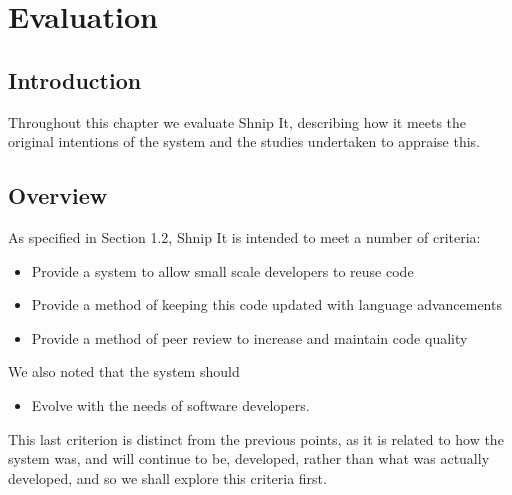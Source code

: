 \chapter{Evaluation} \label{evaluation}

\section{Introduction}
Throughout this chapter we evaluate Shnip It, describing how it meets the original intentions of the system and the studies undertaken to appraise this.

\section{Overview}
As specified in Section 1.2, Shnip It is intended to meet a number of criteria:

\begin{itemize}
\item Provide a system to allow small scale developers to reuse code
\item Provide a method of keeping this code updated with language advancements
\item Provide a method of peer review to increase and maintain code quality
\end{itemize}

We also noted that the system should 
\begin{itemize}
\item Evolve with the needs of software developers. 
\end{itemize}
This last criterion is distinct from the previous points, as it is related to how the system was, and will continue to be, developed, rather than what was actually developed, and so we shall explore this criteria first.

